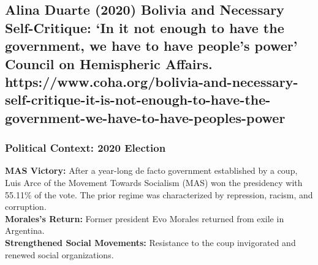 \documentclass{article}
\begin{document}
    \subsection{Alina Duarte (2020) Bolivia and Necessary Self-Critique: ‘In it not enough to have the government, we have to have people’s power’ Council on Hemispheric Affairs. https://www.coha.org/bolivia-and-necessary-self-critique-it-is-not-enough-to-have-the-government-we-have-to-have-peoples-power}

    \subsubsection{Political Context: 2020 Election}

    \noindent \textbf{MAS Victory:} After a year-long de facto government
established by a coup, Luis Arce of the Movement Towards Socialism (MAS) won
the presidency with 55.11\% of the vote. The prior regime was characterized
by repression, racism, and corruption.\\

    \noindent \textbf{Morales's Return:} Former president Evo Morales
returned from exile in Argentina.\\

    \noindent \textbf{Strengthened Social Movements:} Resistance to the coup
invigorated and renewed social organizations.
\end{document}
